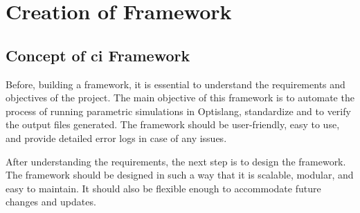 \chapter{Creation of Framework}

\section{Concept of \acrshort{ci} Framework}
Before, building a framework, it is essential to understand the requirements and objectives of the project. The main objective of this framework is to 
automate the process of running parametric simulations in Optislang, standardize and to verify the output files generated. The framework should be user-friendly,
easy to use, and provide detailed error logs in case of any issues.

After understanding the requirements, the next step is to design the framework. The framework should be designed in such a way that it is scalable,
modular, and easy to maintain. It should also be flexible enough to accommodate future changes and updates. 


